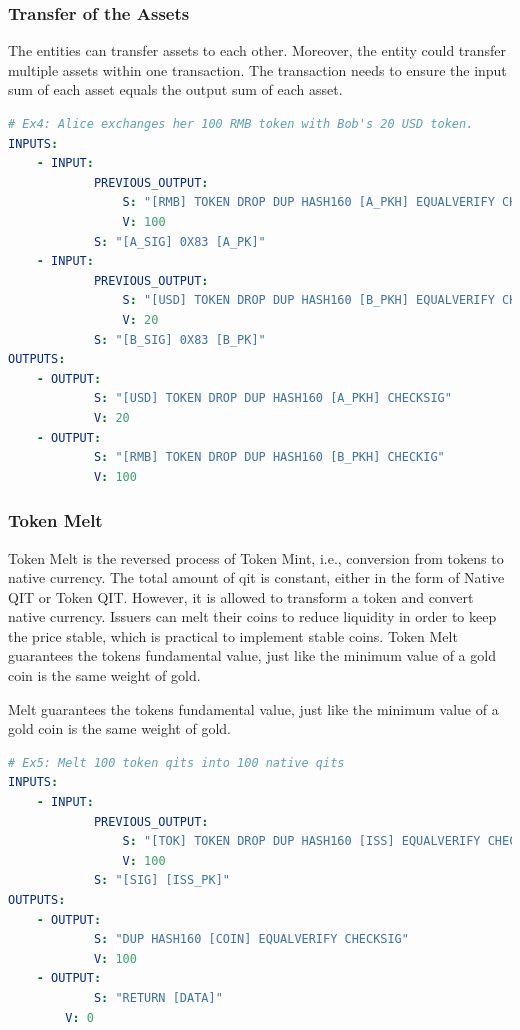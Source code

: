 \documentclass[a4paper,11pt]{article}
\begin{document}
\subsubsection{Transfer of the Assets}

The entities can transfer assets to each other. Moreover, the entity could transfer multiple assets within one transaction. The transaction needs to ensure the input sum of each asset equals the output sum of each asset.

\lstset{basicstyle=\tiny,style=myListStyle}
\begin{lstlisting}[language=yaml, numbers=none,basicstyle=\footnotesize]
# Ex4: Alice exchanges her 100 RMB token with Bob's 20 USD token.
INPUTS:
	- INPUT:
			PREVIOUS_OUTPUT:
				S: "[RMB] TOKEN DROP DUP HASH160 [A_PKH] EQUALVERIFY CHECKSIG"
				V: 100
			S: "[A_SIG] 0X83 [A_PK]"
	- INPUT:
			PREVIOUS_OUTPUT:
				S: "[USD] TOKEN DROP DUP HASH160 [B_PKH] EQUALVERIFY CHECKSIG"
				V: 20
			S: "[B_SIG] 0X83 [B_PK]"
OUTPUTS:
	- OUTPUT:
			S: "[USD] TOKEN DROP DUP HASH160 [A_PKH] CHECKSIG"
			V: 20
	- OUTPUT:
			S: "[RMB] TOKEN DROP DUP HASH160 [B_PKH] CHECKIG"
			V: 100
\end{lstlisting}


\subsubsection{Token Melt}

Token Melt is the reversed process of Token Mint, i.e., conversion from tokens to native currency. The total amount of qit is constant, either in the form of Native QIT or Token QIT. However, it is allowed to transform a token and convert native currency. Issuers can melt their coins to reduce liquidity in order to keep the price stable, which is practical to implement stable coins. Token Melt guarantees the tokens fundamental value, just like the minimum value of a gold coin is the same weight of gold.   


Melt guarantees the tokens fundamental value, just like the minimum value of a gold coin is the same weight of gold.

\lstset{basicstyle=\tiny,style=myListStyle}
\begin{lstlisting}[language=yaml, numbers=none,basicstyle=\footnotesize]
# Ex5: Melt 100 token qits into 100 native qits
INPUTS:
	- INPUT:
			PREVIOUS_OUTPUT:
				S: "[TOK] TOKEN DROP DUP HASH160 [ISS] EQUALVERIFY CHECKSIG"
				V: 100
			S: "[SIG] [ISS_PK]"
OUTPUTS:
	- OUTPUT:
			S: "DUP HASH160 [COIN] EQUALVERIFY CHECKSIG"
			V: 100
	- OUTPUT:
			S: "RETURN [DATA]"
		V: 0
\end{lstlisting}
\end{document}
